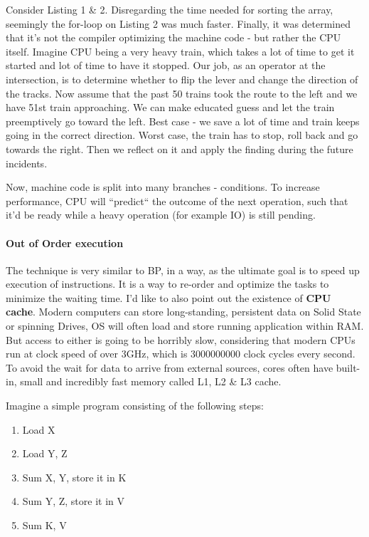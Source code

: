 \documentclass{article}
\begin{document}
Consider Listing 1 \& 2. Disregarding the time needed for sorting the array, seemingly the for-loop on Listing 2 was much faster. Finally, it was determined that it's not the compiler optimizing the machine code - but rather the CPU itself. Imagine CPU being a very heavy train, which takes a lot of time to get it started and lot of time to have it stopped. Our job, as an operator at the intersection, is to determine whether to flip the lever and change the direction of the tracks. Now assume that the past 50 trains took the route to the left and we have 51st train approaching. We can make educated guess and let the train preemptively go toward the left. Best case - we save a lot of time and train keeps going in the correct direction. Worst case, the train has to stop, roll back and go towards the right. Then we reflect on it and apply the finding during the future incidents.

Now, machine code is split into many branches - conditions. To increase performance, CPU will ``predict`` the outcome of the next operation, such that it'd be ready while a heavy operation (for example IO) is still pending.

\paragraph{Out of Order execution}
The technique is very similar to BP, in a way, as the ultimate goal is to speed up execution of instructions. It is a way to re-order and optimize the tasks to minimize the waiting time. I'd like to also point out the existence of \textbf{CPU cache}. Modern computers can store long-standing, persistent data on Solid State or spinning Drives, OS will often load and store running application within RAM. But access to either is going to be horribly slow, considering that modern CPUs run at clock speed of over 3GHz, which is 3000000000 clock cycles every second. To avoid the wait for data to arrive from external sources, cores often have built-in, small and incredibly fast memory called L1, L2 \& L3 cache.

Imagine a simple program consisting of the following steps:
\begin{enumerate}
  \item Load X
  \item Load Y, Z
  \item Sum X, Y, store it in K
  \item Sum Y, Z, store it in V
  \item Sum K, V
\end{enumerate}
\end{document}
